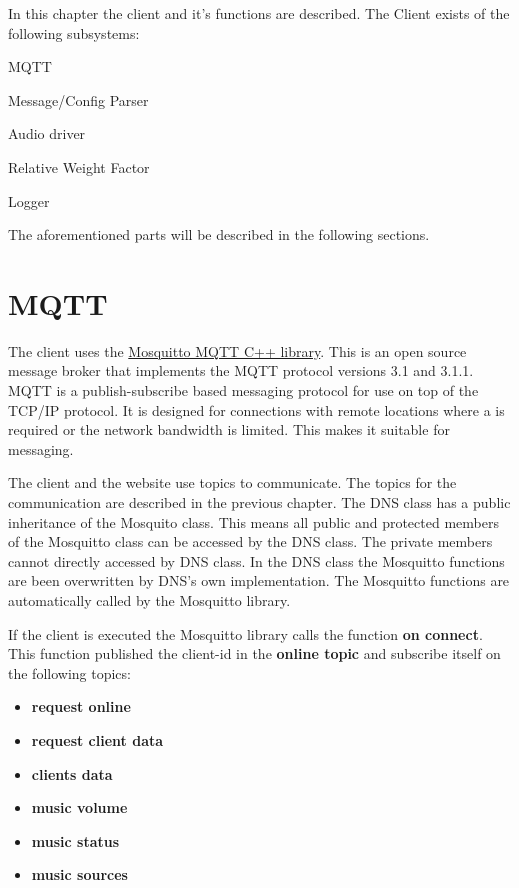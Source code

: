 In this chapter the client and it's functions are described. The Client exists of the following subsystems:
\begin{shortlist}
    \item MQTT
    \item Message/Config Parser
    \item Audio driver
    \item Relative Weight Factor
    \item Logger
\end{shortlist}

The aforementioned parts will be described in the following sections.

\section{MQTT}

The client uses the \href{http://mosquitto.org/}{Mosquitto MQTT C++ library}.
This is an open source message broker that implements the MQTT protocol versions 3.1 and 3.1.1.
MQTT is a publish-subscribe based  messaging protocol for use on top of the TCP/IP protocol.
It is designed for connections with remote locations where a  is required or the network bandwidth is limited.
This makes it suitable for  messaging.

The client and the website use topics to communicate. The topics for the communication are described in the previous chapter.
The DNS class has a public inheritance of the Mosquito class.
This means all public and protected members of the Mosquitto class can be accessed by the DNS class.
The private members cannot directly accessed by DNS class. In the DNS class the Mosquitto functions are been overwritten by DNS's own implementation.
The Mosquitto functions are automatically called by the Mosquitto library.

If the client is executed the Mosquitto library calls the function
\textbf{ on connect}. This function published the client-id in the \textbf{online topic } and subscribe itself on the following topics:
\small{
\begin{itemize} [noitemsep, nolistsep]
	\item \textbf {request online}
	\item \textbf {request client data}
	\item \textbf {clients data}
	\item \textbf {music volume}
	\item \textbf {music status}
	\item \textbf {music sources}
\end{itemize}
}

